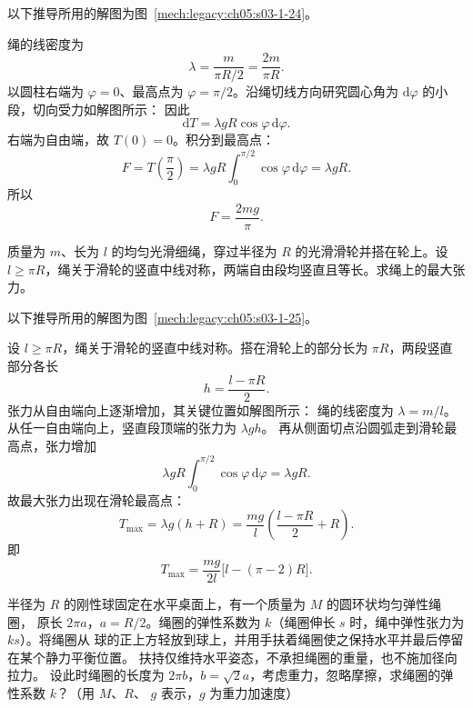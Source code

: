 {\begin{xesolution}
以下推导所用的解图为图~\ref{mech:legacy:ch05:s03-1-24}。

绳的线密度为
\[
  \lambda=\frac{m}{\pi R/2}=\frac{2m}{\pi R}.
\]
以圆柱右端为 $\varphi=0$、最高点为 $\varphi=\pi/2$。沿绳切线方向研究圆心角为
$\mathrm d\varphi$ 的小段，切向受力如解图所示：
\soldiagOneTwentyFour
因此
\[
  \mathrm dT=\lambda gR\cos\varphi\,\mathrm d\varphi.
\]
右端为自由端，故 $T(0)=0$。积分到最高点：
\[
  F=T\!\left(\frac\pi2\right)
  =\lambda gR\int_0^{\pi/2}\cos\varphi\,\mathrm d\varphi
  =\lambda gR.
\]
所以
\[
  \boxed{F=\frac{2mg}{\pi}}.
\]
\end{xesolution}

\begin{origexamplebox}{}\label{ch05:ex:s03-1-25}
质量为 $m$、长为 $l$ 的均匀光滑细绳，穿过半径为 $R$ 的光滑滑轮并搭在轮上。设
$l\ge\pi R$，绳关于滑轮的竖直中线对称，两端自由段均竖直且等长。求绳上的最大张力。
\end{origexamplebox}

\begin{xesolution}
以下推导所用的解图为图~\ref{mech:legacy:ch05:s03-1-25}。

设 $l\ge\pi R$，绳关于滑轮的竖直中线对称。搭在滑轮上的部分长为 $\pi R$，两段竖直
部分各长
\[
  h=\frac{l-\pi R}{2}.
\]
张力从自由端向上逐渐增加，其关键位置如解图所示：
\soldiagOneTwentyFive
绳的线密度为 $\lambda=m/l$。从任一自由端向上，竖直段顶端的张力为 $\lambda gh$。
再从侧面切点沿圆弧走到滑轮最高点，张力增加
\[
  \lambda gR\int_0^{\pi/2}\cos\varphi\,\mathrm d\varphi=\lambda gR.
\]
故最大张力出现在滑轮最高点：
\[
  T_{\max}=\lambda g(h+R)
  =\frac{mg}{l}\left(\frac{l-\pi R}{2}+R\right).
\]
即
\[
  \boxed{T_{\max}=\frac{mg}{2l}\bigl[l-(\pi-2)R\bigr]}.
\]
\end{xesolution}

\begin{origexamplebox}{}\label{ch05:ex:s03-1-26}
半径为 $R$ 的刚性球固定在水平桌面上，有一个质量为 $M$ 的圆环状均匀弹性绳圈，
原长 $2\pi a$，$a=R/2$。绳圈的弹性系数为 $k$（绳圈伸长 $s$ 时，绳中弹性张力为 $ks$）。将绳圈从
球的正上方轻放到球上，并用手扶着绳圈使之保持水平并最后停留在某个静力平衡位置。
扶持仅维持水平姿态，不承担绳圈的重量，也不施加径向拉力。
设此时绳圈的长度为 $2\pi b$，$b=\sqrt{2}a$，考虑重力，忽略摩擦，求绳圈的弹性系数 $k$？（用 $M$、$R$、
$g$ 表示，$g$ 为重力加速度）
\end{origexamplebox}

}
